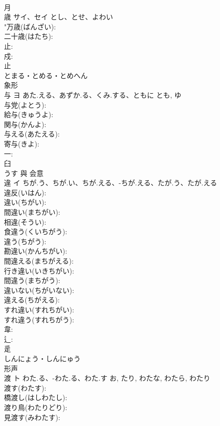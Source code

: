 \documentclass[8pt]{extreport}
\begin{document}
\begin{CJK}{UTF8}{min}
\\	月 
\\	歳	サイ、セイ	とし、とせ、よわい		
\\	"万歳(ばんざい): 
\\	二十歳(はたち): 
\\	止: 
\\	戍: 
\\	止	
\\	とまる・とめる・とめへん	
\\	象形 
\\	与	ヨ	あた.える、あずか.る、くみ.する、ともに	とも, ゆ	
\\	与党(よとう): 
\\	給与(きゅうよ): 
\\	関与(かんよ): 
\\	与える(あたえる): 
\\	寄与(きよ): 
\\	一: 
\\	臼	
\\	うす	與	会意 
\\	違	イ	ちが.う、ちが.い、ちが.える、-ちが.える、たが.う、たが.える		
\\	違反(いはん): 
\\	違い(ちがい): 
\\	間違い(まちがい): 
\\	相違(そうい): 
\\	食違う(くいちがう): 
\\	違う(ちがう): 
\\	勘違い(かんちがい): 
\\	間違える(まちがえる): 
\\	行き違い(いきちがい): 
\\	間違う(まちがう): 
\\	違いない(ちがいない): 
\\	違える(ちがえる): 
\\	すれ違い(すれちがい): 
\\	すれ違う(すれちがう): 
\\	韋: 
\\	辶: 
\\	辵	
\\	しんにょう・しんにゅう	
\\	形声 
\\	渡	ト	わた.る、-わた.る、わた.す	お, たり, わたな, わたら, わたり	
\\	渡す(わたす): 
\\	橋渡し(はしわたし): 
\\	渡り鳥(わたりどり): 
\\	見渡す(みわたす): 

\end{CJK}
\end{document}
